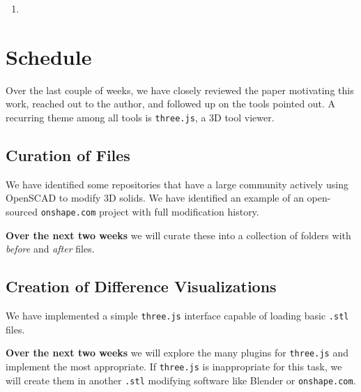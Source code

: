 \documentclass[sigconf,authorversion,nonacm]{acmart}
\begin{document}
\begin{enumerate}
\begin{description}
	      \end{description}
	\item
\end{enumerate}

\section{Schedule}

Over the last couple of weeks, we have closely reviewed the paper motivating this work, reached out to the author, and followed up on the tools pointed out. A recurring theme among all tools is \texttt{three.js}, a 3D tool viewer.


\subsection{Curation of Files}

We have identified some repositories that have a large community actively using OpenSCAD to modify 3D solids. We have identified an example of an open-sourced \texttt{onshape.com} project with full modification history.

\textbf{Over the next two weeks} we will curate these into a collection of folders with \emph{before} and \emph{after} files.

\subsection{Creation of Difference Visualizations}

We have implemented a simple \texttt{three.js} interface capable of loading basic \texttt{.stl} files.

\textbf{Over the next two weeks} we will explore the many plugins for \texttt{three.js} and implement the most appropriate. If \texttt{three.js} is inappropriate for this task, we will create them in another \texttt{.stl} modifying software like Blender or \texttt{onshape.com}.


\end{document}
